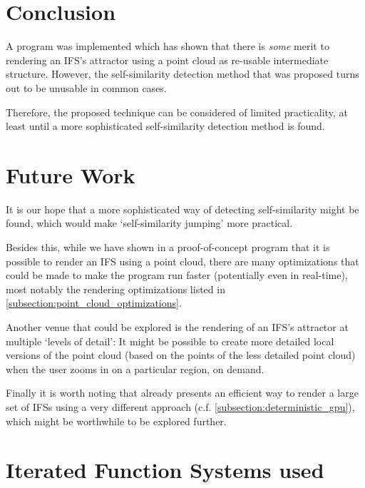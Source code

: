 \documentclass[11pt]{article}
\begin{document}
\section{Conclusion}
\label{sec:org764ae14}
\label{section:conclusion}

A program was implemented which has shown that there is \emph{some} merit to rendering an IFS's attractor using a point cloud as re-usable intermediate structure.
However, the self-similarity detection method that was proposed turns out to be unusable in common cases.

Therefore, the proposed technique can be considered of limited practicality, 
at least until a more sophisticated self-similarity detection method is found.

\section{Future Work}
\label{sec:orga088b2c}
\label{section:further_work}

It is our hope that a more sophisticated way of detecting self-similarity might be found,
which would make `self-similarity jumping' more practical.

Besides this, while we have shown in a proof-of-concept program that it is possible to render an IFS using a point cloud,
there are many optimizations that could be made to make the program run faster (potentially even in real-time),
most notably the rendering optimizations listed in \autoref{subsection:point_cloud_optimizations}.

Another venue that could be explored is the rendering of an IFS's attractor at multiple `levels of detail':
It might be possible to create more detailed local versions of the point cloud (based on the points of the less detailed point cloud) when the user
zooms in on a particular region, on demand.

Finally it is worth noting that \cite{lawlor2012gpu} already presents an efficient way to render 
a large set of IFSs using a very different approach (c.f. \autoref{subsection:deterministic_gpu}), 
which might be worthwhile to be explored further.

\pagebreak
\printbibliography
\clearpage

\appendix

\section{Iterated Function Systems used}
\label{sec:org2990aae}
\end{document}
